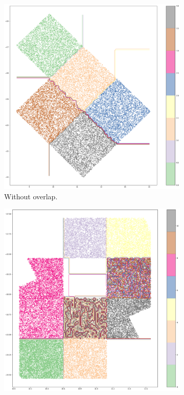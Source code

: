 \begin{figure}[htbp]
    \begin{subfigure}[]{0.5\textwidth}
    \includegraphics[width=\textwidth]{images/A2_prototypes/tu_multifile_tree.png}
    \caption{Without overlap.}\label{subfig:tu_multifile}
    \end{subfigure}
    \hfill
    \begin{subfigure}[]{0.5\textwidth}
    \includegraphics[width=\textwidth]{images/A2_prototypes/mer_multifile_tree.png}

\end{subfigure}
\end{figure}
